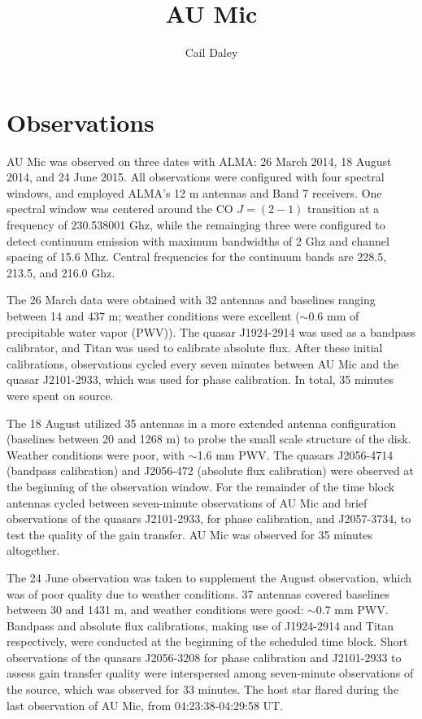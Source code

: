 \documentclass[11pt,modern]{aastex6}
\begin{document}
\title{AU Mic}

\author{Cail Daley}


\section{Observations}

AU Mic was observed on three dates with ALMA: 26 March 2014, 18 August 2014, and
24 June 2015. All observations were configured with four spectral windows, and
employed ALMA's 12 m antennas and Band 7 receivers. One spectral window was
centered around the CO $J = (2-1)$ transition at a frequency of 230.538001 Ghz,
while the remainging three were configured to detect continuum emission with
maximum bandwidths of 2 Ghz and channel spacing of 15.6 Mhz. Central frequencies
for the continuum bands are 228.5, 213.5, and 216.0 Ghz.

The 26 March data were obtained with 32 antennas and baselines ranging between
14 and 437 m; weather conditions were excellent ($\sim$0.6 mm of precipitable
water vapor (PWV)). The quasar J1924-2914 was used as a bandpass calibrator, and Titan
was used to calibrate absolute flux. After these initial calibrations,
observations cycled every seven minutes between AU Mic and the quasar
J2101-2933, which was used for phase calibration. In total, 35 minutes were
spent on source.

The 18 August utilized 35 antennas in a more extended antenna configuration
(baselines between 20 and 1268 m) to probe the small scale structure of the
disk. Weather conditions were poor, with $\sim$1.6 mm PWV. The quasars J2056-4714 (bandpass calibration) and J2056-472 (absolute
flux calibration) were observed at the beginning of the observation window. For
the remainder of the time block antennas cycled between seven-minute
observations of AU Mic and brief observations of the quasars J2101-2933, for
phase calibration, and J2057-3734, to test the quality of the gain transfer. AU
Mic was observed for 35 minutes altogether.

The 24 June observation was taken to supplement the August observation, which was of
poor quality due to weather conditions. 37 antennas covered baselines between 30 and
1431 m, and weather conditions were good: $\sim$0.7 mm PWV. Bandpass and absolute flux calibrations, making use of J1924-2914 and
Titan respectively, were conducted at the beginning of the scheduled time block.
Short observations of the quasars J2056-3208 for phase calibration and
J2101-2933 to assess gain transfer quality were interspersed among
seven-minute observations of the source, which was observed for 33 minutes. The
host star flared during the last observation of AU Mic, from 04:23:38-04:29:58
UT.
\end{document}
